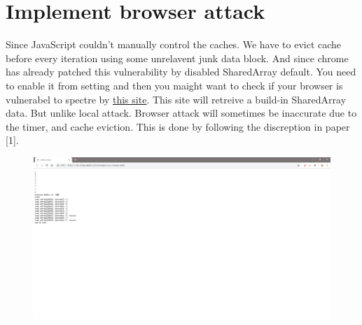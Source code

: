 \documentclass{article}
\begin{document}
\section{Implement browser attack}
Since JavaScript couldn't manually control the caches. We have to evict cache before every iteration using some unrelavent junk data block. And since chrome has already patched this vulnerability by disabled SharedArray default. You need to enable it from setting and then you maight want to check if your browser is vulnerabel to spectre by \href{https://xlab.tencent.com/special/spectre/spectre_check.html}{this site}.
\newline
\newline
This site will retreive a build-in SharedArray data. But unlike local attack. Browser attack will sometimes be inaccurate due to the timer, and cache eviction. This is done by following the discreption in paper [1].
\begin{figure}[H]\centering\includegraphics[width=\textwidth]{02.png}\end{figure}
\end{document}
